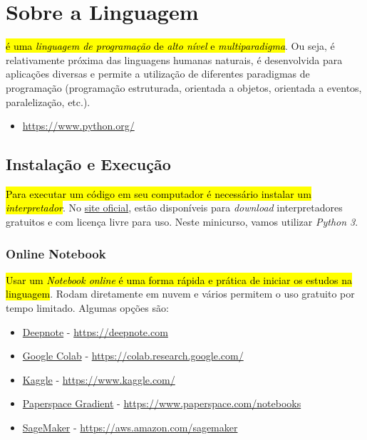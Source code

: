 
\section{Sobre a Linguagem}\label{sec_sobrepy}

\hl{{\python} é uma \emph{linguagem de programação} de \emph{alto nível} e \emph{multiparadigma}}. Ou seja, é relativamente próxima das linguagens humanas naturais, é desenvolvida para aplicações diversas e permite a utilização de diferentes paradigmas de programação (programação estruturada, orientada a objetos, orientada a eventos, paralelização, etc.).

\begin{itemize}
\item {}
  \begin{center}
    \href{https://www.python.org/}{https://www.python.org/}
  \end{center}
\end{itemize}

\subsection{Instalação e Execução}

\hl{Para executar um código {\python} em seu computador é necessário instalar um \emph{interpretador}}. No \href{https://www.python.org/}{site oficial}, estão disponíveis para \textit{download} interpretadores gratuitos e com licença livre para uso. Neste minicurso, vamos utilizar \emph{Python 3}.

\subsubsection{Online Notebook}

\hl{Usar um \emph{\textit{Notebook} {\python} \textit{online}} é uma forma rápida e prática de iniciar os estudos na linguagem}. Rodam diretamente em nuvem e vários permitem o uso gratuito por tempo limitado. Algumas opções são:
\begin{itemize}
\item \href{https://deepnote.com}{Deepnote} - \url{https://deepnote.com}
\item \href{https://colab.research.google.com/}{Google Colab} - \url{https://colab.research.google.com/}
\item \href{https://www.kaggle.com/}{Kaggle} - \url{https://www.kaggle.com/}
\item \href{https://www.paperspace.com/notebooks}{Paperspace Gradient} - \url{https://www.paperspace.com/notebooks}
\item \href{https://aws.amazon.com/sagemaker/}{SageMaker} - \url{https://aws.amazon.com/sagemaker}
\end{itemize}

